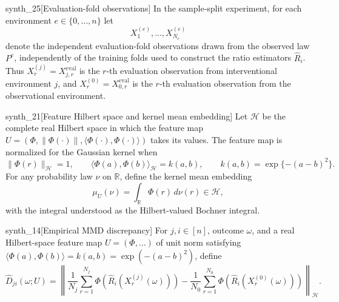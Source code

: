 \documentclass[11pt]{article}
\begin{document}
\begin{definitionv}{synth_25}[Evaluation-fold observations]
In the sample-split experiment, for each environment \(e\in\{0,\ldots,n\}\) let
\[
X^{(e)}_1,\ldots,X^{(e)}_{N_e}
\]
denote the independent evaluation-fold observations drawn from the observed law \(P^e\), independently of the training folds used to construct the ratio estimators \(\widehat R_i\). Thus \(X^{(j)}_r=X^{\mathrm{eval}}_{j,r}\) is the \(r\)-th evaluation observation from interventional environment \(j\), and \(X^{(0)}_r=X^{\mathrm{eval}}_{0,r}\) is the \(r\)-th evaluation observation from the observational environment.
\end{definitionv}

\begin{definitionv}{synth_21}[Feature Hilbert space and kernel mean embedding]
Let \(\mathcal H\) be the complete real Hilbert space in which the feature map \(U=(\Phi,\|\Phi(\cdot)\|,\langle\Phi(\cdot),\Phi(\cdot)\rangle)\) takes its values. The feature map is normalized for the Gaussian kernel when
\[
\|\Phi(r)\|_{\mathcal H}=1,\qquad
\langle \Phi(a),\Phi(b)\rangle_{\mathcal H}=k(a,b),\qquad
k(a,b)=\exp\{-(a-b)^2\}.
\]
For any probability law \(\nu\) on \(\mathbb R\), define the kernel mean embedding
\[
\mu_U(\nu)=\int_{\mathbb R}\Phi(r)\,d\nu(r)\in\mathcal H,
\]
with the integral understood as the Hilbert-valued Bochner integral.
\end{definitionv}

\begin{definitionv}{synth_14}[Empirical MMD discrepancy]
For \(j,i\in[n]\), outcome \(\omega\), and a real Hilbert-space feature map \(U=(\Phi,\ldots)\) of unit norm satisfying \(\langle \Phi(a),\Phi(b)\rangle=k(a,b)=\exp(-(a-b)^2)\), define
\[
\widehat D_{ji}(\omega;U)
=
\left\|
\frac{1}{N_j}\sum_{r=1}^{N_j}\Phi\!\left(\widehat R_i(X^{(j)}_r(\omega))\right)
-
\frac{1}{N_0}\sum_{r=1}^{N_0}\Phi\!\left(\widehat R_i(X^{(0)}_r(\omega))\right)
\right\|_{\mathcal H}.
\]
\end{definitionv}
\end{document}
